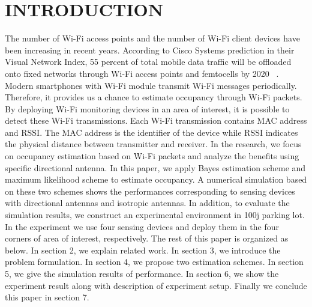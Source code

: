 \chapter[INTRODUCTION]{INTRODUCTION}
The number of Wi-Fi access points and the number of Wi-Fi client devices have been increasing in recent years. According to Cisco Systems prediction in their Visual Network Index, 55 percent of total mobile data traffic will be offloaded onto fixed networks through Wi-Fi access points and femtocells by 2020 ~\cite{CiscoVNI2016}. Modern smartphones with Wi-Fi module transmit Wi-Fi messages periodically. Therefore, it provides us a chance to estimate occupancy through Wi-Fi packets. By deploying Wi-Fi monitoring devices in an area of interest, it is possible to detect these Wi-Fi transmissions. Each Wi-Fi transmission contains MAC address and RSSI. The MAC address is the identifier of the device while RSSI indicates the physical distance between transmitter and receiver. In the research, we focus on occupancy estimation based on Wi-Fi packets and analyze the benefits using specific directional antenna.
In this paper, we apply Bayes estimation scheme and maximum likelihood scheme to estimate occupancy. A numerical simulation based on these two schemes shows the performances corresponding to sensing devices with directional antennas and isotropic antennas. In addition, to evaluate the simulation results, we construct an experimental environment in 100j parking lot. In the experiment we use four sensing devices and deploy them in the four corners of area of interest, respectively.
The rest of this paper is organized as below. In section 2, we explain related work. In section 3, we introduce the problem formulation. In section 4, we propose two estimation schemes. In section 5, we give the simulation results of performance. In section 6, we show the experiment result along with description of experiment setup. Finally we conclude this paper in section 7.

 






 


